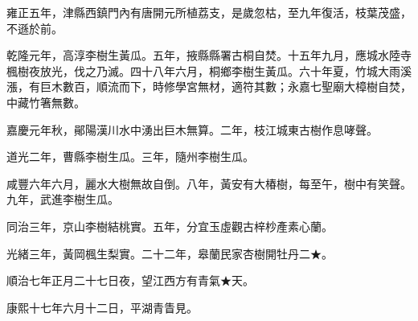 \begin{pinyinscope}
雍正五年，津縣西鎮門內有唐開元所植荔支，是歲忽枯，至九年復活，枝葉茂盛，不遜於前。

乾隆元年，高淳李樹生黃瓜。五年，掖縣縣署古桐自焚。十五年九月，應城水陸寺楓樹夜放光，伐之乃滅。四十八年六月，桐鄉李樹生黃瓜。六十年夏，竹城大雨溪漲，有巨木數百，順流而下，時修學宮無材，適符其數；永嘉七聖廟大樟樹自焚，中藏竹箸無數。

嘉慶元年秋，鄖陽漢川水中湧出巨木無算。二年，枝江城東古樹作息哮聲。

道光二年，曹縣李樹生瓜。三年，隨州李樹生瓜。

咸豐六年六月，麗水大樹無故自倒。八年，黃安有大椿樹，每至午，樹中有笑聲。九年，武進李樹生瓜。

同治三年，京山李樹結桃實。五年，分宜玉虛觀古梓杪產素心蘭。

光緒三年，黃岡楓生梨實。二十二年，皋蘭民家杏樹開牡丹二★。

順治七年正月二十七日夜，望江西方有青氣★天。

康熙十七年六月十二日，平湖青眚見。


\end{pinyinscope}